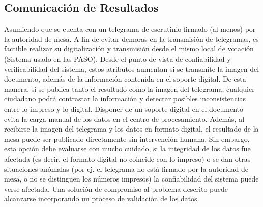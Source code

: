 \subsection{Comunicación de Resultados} Asumiendo que se cuenta con un telegrama de escrutinio firmado (al menos) por la autoridad de mesa. A fin de evitar demoras en la transmisión de telegramas, es factible realizar su digitalización y transmisión desde el mismo local de votación (Sistema usado en las PASO). Desde el punto de vista de confiabilidad y verificabilidad del sistema, estos atributos aumentan si se transmite la imagen del documento, además de la información contenida en el soporte digital. De esta manera, si se publica tanto el resultado como la imagen del telegrama, cualquier ciudadano podrá contrastar la información y detectar posibles inconsistencias entre lo impreso y lo digital.\newline
    Disponer de un soporte digital en el documento evita la carga manual de los datos en el centro de procesamiento. Además, al recibirse la imagen del telegrama y los datos en formato digital, el resultado de la mesa puede ser publicado directamente sin intervención humana. Sin embargo, esta opción debe evaluarse con mucho cuidado, si la integridad de los datos fue afectada (es decir, el formato digital no coincide con lo impreso) o se dan otras situaciones anómalas (por ej. el telegrama no está firmado por la autoridad de mesa, o no se distinguen los números impresos) la confiabilidad del sistema puede verse afectada. Una solución de compromiso al problema descrito puede alcanzarse incorporando un proceso de validación de los datos.
